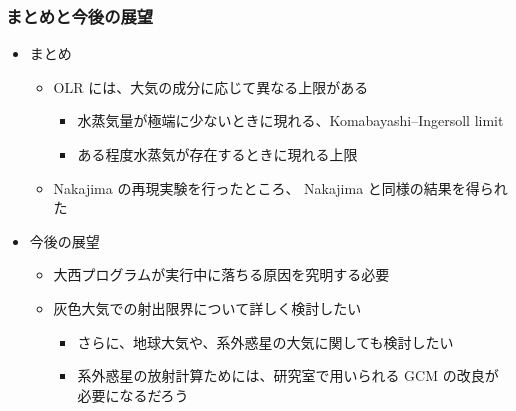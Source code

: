 \documentclass[aspectratio=149,9pt]{beamer}
\begin{document}
\begin{frame}
	\frametitle{まとめと今後の展望}
	\begin{itemize}
		\item まとめ
			\begin{itemize}
				\item OLR には、大気の成分に応じて異なる上限がある
					\begin{itemize}
						\item 水蒸気量が極端に少ないときに現れる、Komabayashi--Ingersoll limit
						\item ある程度水蒸気が存在するときに現れる上限
					\end{itemize}
				\item Nakajima \etal の再現実験を行ったところ、
					Nakajima \etal と同様の結果を得られた
			\end{itemize}
		\item 今後の展望
			\begin{itemize}
				\item 大西プログラムが実行中に落ちる原因を究明する必要
				\item 灰色大気での射出限界について詳しく検討したい
					\begin{itemize}
						\item さらに、地球大気や、系外惑星の大気に関しても検討したい
						\item 系外惑星の放射計算ためには、研究室で用いられる
							GCM の改良が必要になるだろう
					\end{itemize}
			\end{itemize}
	\end{itemize}
\end{frame}
\end{document}
